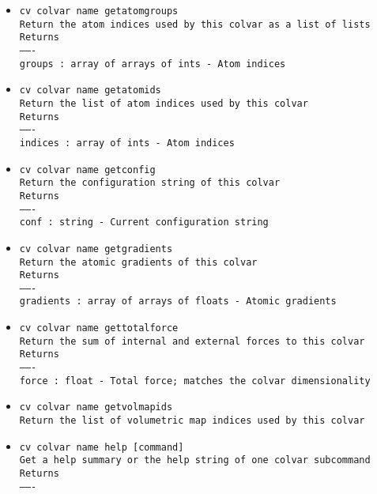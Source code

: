 \begin{itemize}
\item \texttt{cv colvar name getatomgroups}
\\
\texttt{Return the atom indices used by this colvar as a list of lists}
\\
\texttt{Returns}
\\
\texttt{-------}
\\
\texttt{groups : array of arrays of ints - Atom indices}
\item \texttt{cv colvar name getatomids}
\\
\texttt{Return the list of atom indices used by this colvar}
\\
\texttt{Returns}
\\
\texttt{-------}
\\
\texttt{indices : array of ints - Atom indices}
\item \texttt{cv colvar name getconfig}
\\
\texttt{Return the configuration string of this colvar}
\\
\texttt{Returns}
\\
\texttt{-------}
\\
\texttt{conf : string - Current configuration string}
\item \texttt{cv colvar name getgradients}
\\
\texttt{Return the atomic gradients of this colvar}
\\
\texttt{Returns}
\\
\texttt{-------}
\\
\texttt{gradients : array of arrays of floats - Atomic gradients}
\item \texttt{cv colvar name gettotalforce}
\\
\texttt{Return the sum of internal and external forces to this colvar}
\\
\texttt{Returns}
\\
\texttt{-------}
\\
\texttt{force : float - Total force; matches the colvar dimensionality}
\item \texttt{cv colvar name getvolmapids}
\\
\texttt{Return the list of volumetric map indices used by this colvar}
\item \texttt{cv colvar name help [command]}
\\
\texttt{Get a help summary or the help string of one colvar subcommand}
\\
\texttt{Returns}
\\
\texttt{-------}
\\

\end{itemize}
